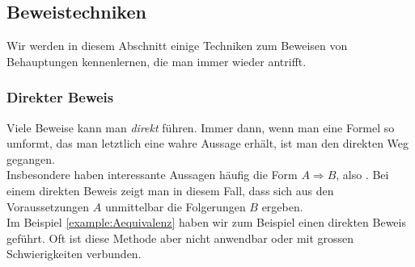 \subsection{Beweistechniken}
Wir werden in diesem Abschnitt einige Techniken zum Beweisen von Behauptungen kennenlernen, die man immer wieder antrifft.
\subsubsection{Direkter Beweis}
Viele Beweise kann man \textit{direkt} führen. Immer dann, wenn man eine Formel so umformt, das man letztlich eine wahre Aussage erhält, ist man den direkten Weg gegangen.\\

\noindent
Insbesondere haben interessante Aussagen häufig die Form $A\Rightarrow B$, also . Bei einem direkten Beweis zeigt man in diesem Fall, dass sich aus den Voraussetzungen $A$ unmittelbar die Folgerungen $B$ ergeben.\\
Im Beispiel \cref{example:Aequivalenz} haben wir zum Beispiel einen direkten Beweis geführt. Oft ist diese Methode aber nicht anwendbar oder mit grossen Schwierigkeiten verbunden.

